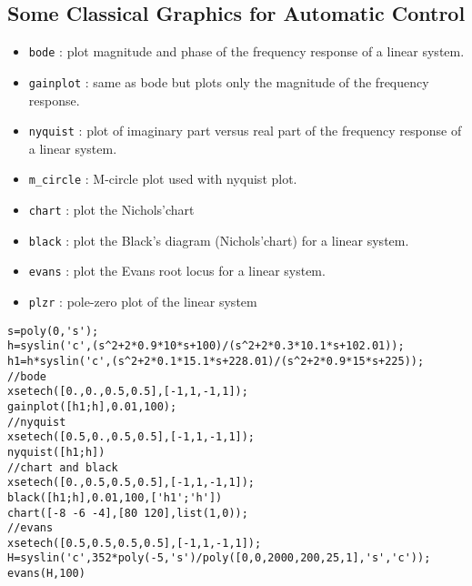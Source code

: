 \subsection{Some Classical Graphics for Automatic Control}

\begin{itemize}

	\item  \verb+bode+	: plot magnitude and phase of the 
frequency response of a linear system.

	\item  \verb+gainplot+	: same as bode but plots only the 
magnitude of the frequency response.

	\item  \verb+nyquist+	: plot of imaginary part versus real 
part of the frequency response of a linear system.

	\item  \verb+m_circle+	: M-circle plot used with nyquist plot.

	\item  \verb+chart+	: plot the Nichols'chart 

	\item  \verb+black+	: plot the Black's diagram (Nichols'chart)
for a linear system.  

	\item  \verb+evans+	: plot the Evans root locus for a
linear system.

	\item  \verb+plzr+	: pole-zero plot of the linear system

\end{itemize}

\begin{verbatim}
s=poly(0,'s');
h=syslin('c',(s^2+2*0.9*10*s+100)/(s^2+2*0.3*10.1*s+102.01));
h1=h*syslin('c',(s^2+2*0.1*15.1*s+228.01)/(s^2+2*0.9*15*s+225));
//bode
xsetech([0.,0.,0.5,0.5],[-1,1,-1,1]);
gainplot([h1;h],0.01,100);
//nyquist
xsetech([0.5,0.,0.5,0.5],[-1,1,-1,1]);
nyquist([h1;h])
//chart and black 
xsetech([0.,0.5,0.5,0.5],[-1,1,-1,1]);
black([h1;h],0.01,100,['h1';'h'])
chart([-8 -6 -4],[80 120],list(1,0));
//evans
xsetech([0.5,0.5,0.5,0.5],[-1,1,-1,1]);
H=syslin('c',352*poly(-5,'s')/poly([0,0,2000,200,25,1],'s','c'));
evans(H,100)
\end{verbatim}



%
